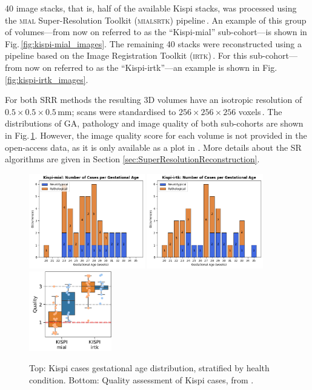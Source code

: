 40 image stacks, that is, half of the available Kispi stacks, was processed using the \textsc{mial} Super-Resolution Toolkit (\textsc{mialsrtk}) pipeline\,\cite{Tourbier2015, MIALSRTK}. An example of this group of volumes---from now on referred to as the \enquote{Kispi-mial} sub-cohort---is shown in Fig.\,\ref{fig:kispi-mial_images}. The remaining 40 stacks were reconstructed using a pipeline based on the Image Registration Toolkit (\textsc{irtk})\,\cite{Kuklisova2012, irtk-simple}. For this sub-cohort---from now on referred to as the \enquote{Kispi-irtk}---an example is shown in Fig.\,\ref{fig:kispi-irtk_images}.

For both SRR methods the resulting 3D volumes have an isotropic resolution of $0.5 \times 0.5 \times 0.5$\,mm; scans were standardised to $256 \times 256 \times 256$ voxels\,\cite{FeTA2021_review}. The distributions of GA, pathology and image quality of both sub-cohorts are shown in Fig.\,\ref{fig:kispi_plots}. However, the image quality score for each volume is not provided in the open-access data, as it is only available as a plot in \cite{FeTA2024_review}. More details about the SR algorithms are given in Section \ref{sec:SuperResolutionReconstruction}.

\begin{figure}[hbt]
    \centering
    \includegraphics[width=0.45\textwidth]{figures/k-mial_GA.png} \quad
    \includegraphics[width=0.45\textwidth]{figures/k-irtk_GA.png}\\
    \vspace{10pt}
    \includegraphics[width=0.32\textwidth]{figures/kispi_quality.png}
    \caption{Top: Kispi cases gestational age distribution, stratified by health condition. Bottom: Quality assessment of Kispi cases, from \cite{FeTA2024_review}.}
    \label{fig:kispi_plots}
\end{figure}

